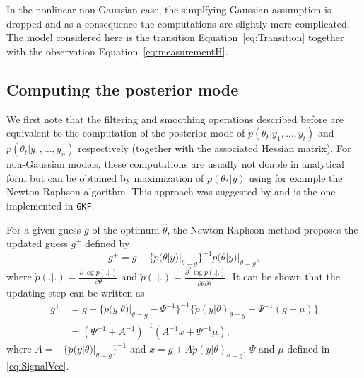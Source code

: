 \documentclass{article}
\newcommand{\GKF}{\texttt{GKF}\xspace}
\begin{document}
In the nonlinear non-Gaussian case, the simplfying Gaussian assumption is
dropped and as a consequence the computations are slightly more complicated. The
model considered here is the transition Equation~\eqref{eq:Transition} together
with the observation Equation~\eqref{eq:measurementH}.

\subsection{Computing the posterior mode}

We first note that the filtering and smoothing operations described before are equivalent to
the computation of the posterior mode of $p(\theta_t|y_1,\dots,y_t)$ and
$p(\theta_t|y_1,\dots,y_n)$ respectively (together with the associated Hessian matrix). For
non-Gaussian models, these computations are usually not doable in analytical form but can be
obtained by maximization of $p(\theta_*|y)$ using for example the Newton-Raphson
algorithm. This approach was suggested by \citet{jungbacker2007monte} and is the one
implemented in \GKF.

For a given guess $g$ of the optimum $\hat{\theta}$, the Newton-Raphson method proposes the
updated guess $g^+$ defined by
\begin{equation*}
  g^+ = g -\{ \ddot{p}(\theta|y)|_{\theta=g} \}^{-1} \dot{p}(\theta|y)|_{\theta=g}
  ,
\end{equation*}
where $ \dot{p} (.|.) = \frac{\partial \log p (.|.)}{ \partial \theta}$ and $ \ddot{p} (.|.) = \frac{\partial^2 \log p (.|.)}{ \partial \theta \partial \theta^{\prime}}$.
It can be shown that the updating step can be written as
\begin{align}
    g^+ &= g - \{\ddot{p}(y|\theta)|_{\theta=g} - \Psi^{-1}  \}^{-1} \{
          \dot{p}(y|\theta)_{\theta=g} - \Psi^{-1} (g- \mu) \} \nonumber \\
        &= (\Psi^{-1} + A^{-1})^{-1} (A^{-1} x + \Psi^{-1} \mu)
  ,
  \label{eq:NewtonStep}
\end{align}
where $ A = - \{\ddot{p}(y|\theta)|_{\theta=g} \}^{-1} $ and $x=g + A \dot{p}(y|\theta)_{\theta=g}$, $\Psi$ and $\mu$ defined in \eqref{eq:SignalVec}.
\end{document}
